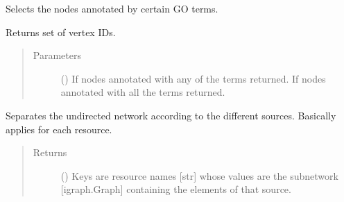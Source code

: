 \documentclass[letterpaper,10pt,english]{sphinxmanual}
\begin{document}
\begin{fulllineitems}
\begin{fulllineitems}
\begin{quote}
\begin{description}
\end{description}\end{quote}

\end{fulllineitems}


\begin{fulllineitems}
\label{\detokenize{main:pypath.main.PyPath.second_neighbours}}
\end{fulllineitems}


\begin{fulllineitems}
\label{\detokenize{main:pypath.main.PyPath.select_by_go}}
Selects the nodes annotated by certain GO terms.

Returns set of vertex IDs.
\begin{quote}\begin{description}
\item[{Parameters}] \leavevmode
{} () \textendash{} If  nodes annotated with any of the terms returned.
If  nodes annotated with all the terms returned.

\end{description}\end{quote}

\end{fulllineitems}


\begin{fulllineitems}
\label{\detokenize{main:pypath.main.PyPath.separate}}
Separates the undirected network according to the different
sources. Basically applies
{\hyperref[\detokenize{main:pypath.main.PyPath.get_network}]{}} for each resource.
\begin{quote}\begin{description}
\item[{Returns}] \leavevmode
() \textendash{} Keys are resource names {[}str{]} whose values are
the subnetwork {[}igraph.Graph{]} containing the elements of
that source.


\end{description}
\end{quote}
\end{fulllineitems}
\end{fulllineitems}
\end{document}
